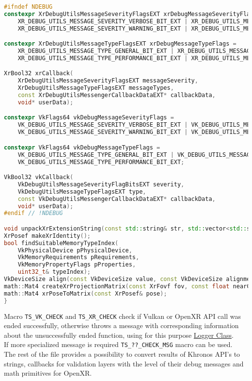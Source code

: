 \begin{itemize}
\begin{lstlisting}[language=c++, caption=Khronos Utils (./engine/src/khronos\_utils.h)]
#ifndef NDEBUG
constexpr XrDebugUtilsMessageSeverityFlagsEXT xrDebugMessageSeverityFlags =
    XR_DEBUG_UTILS_MESSAGE_SEVERITY_VERBOSE_BIT_EXT | XR_DEBUG_UTILS_MESSAGE_SEVERITY_INFO_BIT_EXT |
    XR_DEBUG_UTILS_MESSAGE_SEVERITY_WARNING_BIT_EXT | XR_DEBUG_UTILS_MESSAGE_SEVERITY_ERROR_BIT_EXT;

constexpr XrDebugUtilsMessageTypeFlagsEXT xrDebugMessageTypeFlags =
    XR_DEBUG_UTILS_MESSAGE_TYPE_GENERAL_BIT_EXT | XR_DEBUG_UTILS_MESSAGE_TYPE_VALIDATION_BIT_EXT |
    XR_DEBUG_UTILS_MESSAGE_TYPE_PERFORMANCE_BIT_EXT | XR_DEBUG_UTILS_MESSAGE_TYPE_CONFORMANCE_BIT_EXT;

XrBool32 xrCallback(
    XrDebugUtilsMessageSeverityFlagsEXT messageSeverity,
    XrDebugUtilsMessageTypeFlagsEXT messageTypes,
    const XrDebugUtilsMessengerCallbackDataEXT* callbackData,
    void* userData);

constexpr VkFlags64 vkDebugMessageSeverityFlags =
    VK_DEBUG_UTILS_MESSAGE_SEVERITY_VERBOSE_BIT_EXT | VK_DEBUG_UTILS_MESSAGE_SEVERITY_INFO_BIT_EXT |
    VK_DEBUG_UTILS_MESSAGE_SEVERITY_WARNING_BIT_EXT | VK_DEBUG_UTILS_MESSAGE_SEVERITY_ERROR_BIT_EXT;

constexpr VkFlags64 vkDebugMessageTypeFlags =
    VK_DEBUG_UTILS_MESSAGE_TYPE_GENERAL_BIT_EXT | VK_DEBUG_UTILS_MESSAGE_TYPE_VALIDATION_BIT_EXT |
    VK_DEBUG_UTILS_MESSAGE_TYPE_PERFORMANCE_BIT_EXT;

VkBool32 vkCallback(
    VkDebugUtilsMessageSeverityFlagBitsEXT severity,
    VkDebugUtilsMessageTypeFlagsEXT type,
    const VkDebugUtilsMessengerCallbackDataEXT* callbackData,
    void* userData);
#endif // !NDEBUG

void unpackXrExtensionString(const std::string& str, std::vector<std::string>& result);
XrPosef makeXrIdentity();
bool findSuitableMemoryTypeIndex(
    VkPhysicalDevice pPhysicalDevice,
    VkMemoryRequirements pRequirements,
    VkMemoryPropertyFlags pProperties,
    uint32_t& typeIndex);
VkDeviceSize align(const VkDeviceSize value, const VkDeviceSize alignment);
math::Mat4 createXrProjectionMatrix(const XrFovf fov, const float nearClip, const float farClip);
math::Mat4 xrPoseToMatrix(const XrPosef& pose);
}
\end{lstlisting}
Macro \texttt{TS\_VK\_CHECK} and \texttt{TS\_XR\_CHECK} check if Vulkan or OpenXR API call was ended successfully, otherwise throws a message with corresponding information about the unsuccessfully ended function, using for this purpose \hyperref[sec:logger]{Logger Class}.\\
If more specialized message is required \texttt{TS\_??\_CHECK\_MSG} macro can be used.\\
The rest of the file provides a possibility to convert results of Khronos API's to strings, callbacks for validation layers with the level of their debug messages and math primitives for OpenXR.
\end{itemize}